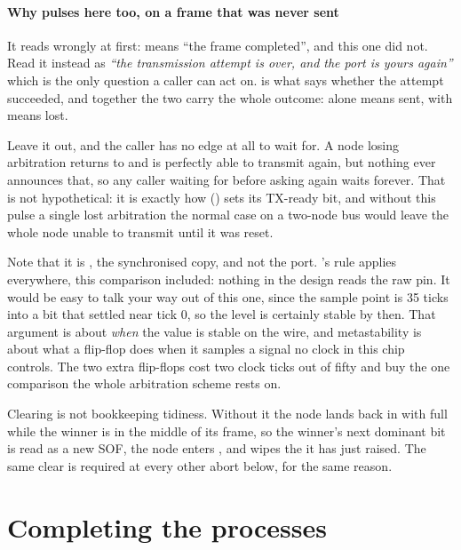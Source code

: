 \paragraph{Why  pulses here too, on a frame that was never sent}
It reads wrongly at first:  means ``the frame completed'', and this one did not. Read it
instead as \emph{``the transmission attempt is over, and the port is yours again''} \textemdash{}
which is the only question a caller can act on.  is what says whether the attempt
succeeded, and together the two carry the whole outcome:  alone means sent,
 with  means lost.

Leave it out, and the caller has no edge at all to wait for. A node losing arbitration returns to
 and is perfectly able to transmit again, but nothing ever announces that, so any
caller waiting for  before asking again waits forever. That is not hypothetical: it is
exactly how  () sets its TX-ready bit, and without this pulse a
single lost arbitration \textemdash{} the normal case on a two-node bus \textemdash{} would leave the
whole node unable to transmit until it was reset.

Note that it is , the synchronised copy, and not the  port.
's rule applies everywhere, this comparison included: nothing in the design reads
the raw pin. It would be easy to talk your way out of this one, since the sample point is 35 ticks
into a bit that settled near tick 0, so the level is certainly stable by then. That argument is about
\emph{when} the value is stable on the wire, and metastability is about what a flip-flop does when it
samples a signal no clock in this chip controls. The two extra flip-flops cost two clock ticks out of
fifty and buy the one comparison the whole arbitration scheme rests on.

Clearing  is not bookkeeping tidiness. Without it the node lands back in
 with  full while the winner is in the middle of its frame, so the
winner's next dominant bit is read as a new SOF, the node enters , and
 wipes the  it has just raised. The same clear is required at every other
abort below, for the same reason.

\section{Completing the processes}
\label{c17:sec:complete}

